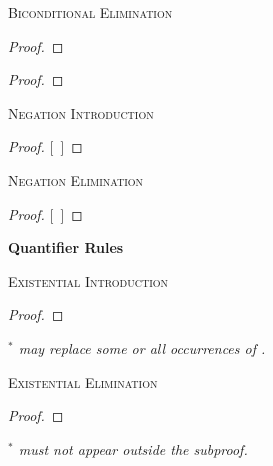 \textsc{Biconditional Elimination}

\begin{proof}
	 
\end{proof}

\begin{proof}
	 
\end{proof}



\textsc{Negation Introduction}

\begin{proof}
\open
	\metaA{}
	\metaB{}
\close
{}[\ ]{\enot\metaA{}}
\end{proof}

\textsc{Negation Elimination}

\begin{proof}
\open
	\metaB{}
\close
{}[\ ]\metaA{}
\end{proof}






\newpage

{\large \bf Quantifier Rules}

\textsc{Existential Introduction}

\begin{proof}
	 
\end{proof}

\begin{footnotesize}\emph{
$^\ast$  may replace some or all occurrences of .}
\end{footnotesize}


\textsc{Existential Elimination}

\begin{proof}
	\open	
	\close
	 
\end{proof}

\begin{footnotesize}\emph{
$^\ast$  must not appear outside the subproof.}
\end{footnotesize}


